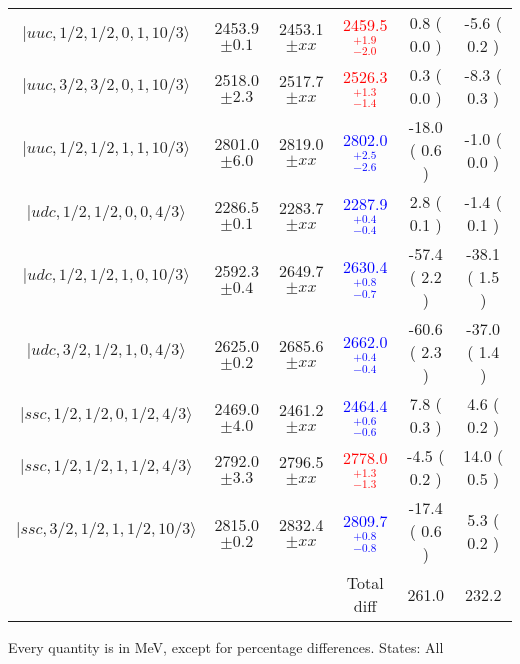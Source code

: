 \begin{tabular}{c | c  c  c  c  c}
$\vert uuc,1/2,1/2,0,1,10/3 \rangle$ & 2453.9 $\pm 0.1 $  & 2453.1 $\pm xx$  & \textcolor{red}{ 2459.5  $^{+ 1.9 }_{ -2.0 }$}  &   0.8 ( 0.0 )  &   -5.6 ( 0.2 ) \\  
$\vert uuc,3/2,3/2,0,1,10/3 \rangle$ & 2518.0 $\pm 2.3 $  & 2517.7 $\pm xx$  & \textcolor{red}{ 2526.3  $^{+ 1.3 }_{ -1.4 }$}  &   0.3 ( 0.0 )  &   -8.3 ( 0.3 ) \\  
$\vert uuc,1/2,1/2,1,1,10/3 \rangle$ & 2801.0 $\pm 6.0 $  & 2819.0 $\pm xx$  & \textcolor{blue}{ 2802.0  $^{+ 2.5 }_{ -2.6 }$}  &   -18.0 ( 0.6 )  &   -1.0 ( 0.0 ) \\  
$\vert udc,1/2,1/2,0,0,4/3  \rangle$ & 2286.5 $\pm 0.1 $  & 2283.7 $\pm xx$  & \textcolor{blue}{ 2287.9  $^{+ 0.4 }_{ -0.4 }$}  &   2.8 ( 0.1 )  &   -1.4 ( 0.1 ) \\  
$\vert udc,1/2,1/2,1,0,10/3 \rangle$ & 2592.3 $\pm 0.4 $  & 2649.7 $\pm xx$  & \textcolor{blue}{ 2630.4  $^{+ 0.8 }_{ -0.7 }$}  &   -57.4 ( 2.2 )  &   -38.1 ( 1.5 ) \\  
$\vert udc,3/2,1/2,1,0,4/3  \rangle$ & 2625.0 $\pm 0.2 $  & 2685.6 $\pm xx$  & \textcolor{blue}{ 2662.0  $^{+ 0.4 }_{ -0.4 }$}  &   -60.6 ( 2.3 )  &   -37.0 ( 1.4 ) \\  
$\vert ssc,1/2,1/2,0,1/2,4/3 \rangle$ & 2469.0 $\pm 4.0 $  & 2461.2 $\pm xx$  & \textcolor{blue}{ 2464.4  $^{+ 0.6 }_{ -0.6 }$}  &   7.8 ( 0.3 )  &   4.6 ( 0.2 ) \\  
$\vert ssc,1/2,1/2,1,1/2,4/3 \rangle$ & 2792.0 $\pm 3.3 $  & 2796.5 $\pm xx$  & \textcolor{red}{ 2778.0  $^{+ 1.3 }_{ -1.3 }$}  &   -4.5 ( 0.2 )  &   14.0 ( 0.5 ) \\  
$\vert ssc,3/2,1/2,1,1/2,10/3 \rangle$ & 2815.0 $\pm 0.2 $  & 2832.4 $\pm xx$  & \textcolor{blue}{ 2809.7  $^{+ 0.8 }_{ -0.8 }$}  &   -17.4 ( 0.6 )  &   5.3 ( 0.2 ) \\  
\hline
  &  &  & Total diff &  261.0  & 232.2 \\ 
\hline \hline
\end{tabular}
\caption{Every quantity is in MeV, except for percentage differences. States: All }
